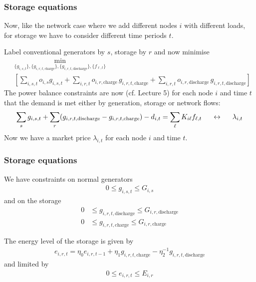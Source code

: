 \documentclass[10pt,aspectratio=169,dvipsnames]{beamer}
\def\l{\lambda}
\begin{document}
\begin{frame}[fragile]
  \frametitle{Storage equations}

  Now, like the network case where we add different nodes $i$
  with different loads, for storage we have to
  consider different time periods $t$.

  Label conventional generators by $s$, storage by $r$ and now minimise
  \begin{align*}
    &    \min_{\{g_{i,s,t}\},\{g_{i,r,t,\textrm{charge}}\},\{g_{i,r,t,\textrm{discharge}}\},\{f_{\ell,t}\}}\\
    &\left[  \sum_{i,s,t} o_{i,s} g_{i,s,t} +   \sum_{i,r,t} o_{i,r,\textrm{charge} }\, g_{i,r,t,\textrm{charge}} +   \sum_{i,r,t} o_{i,r,\textrm{discharge}}\, g_{i,r,t,\textrm{discharge}} \right]
  \end{align*}
  The power balance constraints are now (cf. Lecture 5) for each node $i$ and time $t$ that the demand is met either by generation, storage or network flows:
  \begin{align*}
    \sum_{s} g_{i,s,t} + \sum_{r}(g_{i,r,t,\textrm{discharge}} - g_{i,r,t,\textrm{charge}}) - d_{i,t} = \sum_\ell K_{i\ell}f_{\ell,t}  \hspace{0.5cm}\leftrightarrow\hspace{0.5cm} \l_{i,t}
  \end{align*}
  Now we have a market price $\l_{i,t}$ for each node $i$ and time $t$.
\end{frame}

\begin{frame}[fragile]
  \frametitle{Storage equations}

  We have constraints on normal generators
    \begin{align*}
        0 \leq g_{i,s,t}  \leq  G_{i,s}
  \end{align*}
    and on the storage
    \begin{align*}
    0 & \leq g_{i,r,t,\textrm{discharge}} \leq G_{i,r,\textrm{discharge}} \\
    0 & \leq g_{i,r,t,\textrm{charge}} \leq G_{i,r,\textrm{charge}}
    \end{align*}

    The energy level of the storage is given by
  \begin{align*}
    e_{i,r,t} = \eta_0e_{i,r,t-1} + \eta_1g_{i,r,t,\textrm{charge}} -  \eta_2^{-1} g_{i,r,t,\textrm{discharge}}
  \end{align*}
  and limited by
  \begin{align*}
    0 \leq e_{i,r,t} \leq E_{i,r}
  \end{align*}

\end{frame}
\end{document}
